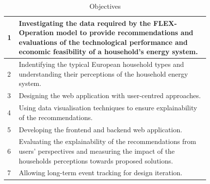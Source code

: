 \begin{table}[h]
    \begin{center}
        \begin{tabular}{ p{0.02\linewidth} p{0.8\linewidth} }
        \hline 
        \cellcolor{yellow!70!lime}1 & Investigating the data required by the FLEX-Operation model to provide recommendations and evaluations of the technological performance and economic feasibility of a household's energy system. \\
        \hline 
        \cellcolor{yellow!60!lime}2 & Indentifying the typical European household types and understanding their perceptions of the household energy system. \\
        \hline 
        \cellcolor{yellow!50!lime}3 & Designing the web application with user-centred approaches. \\
        \hline 
        \cellcolor{yellow!40!lime}4 & Using data visualisation techniques to ensure explainability of the recommendations. \\
        \hline 
        \cellcolor{yellow!30!lime}5 & Developing the frontend and backend web application. \\
        \hline 
        \cellcolor{yellow!20!lime}6 & Evaluating the explainability of the recommendations from users' perspectives and measuring the impact of the households perceptions towards proposed solutions. \\
        \hline
        \cellcolor{yellow!10!lime}7 & Allowing long-term event tracking for design iteration. \\
        \hline 
        \end{tabular}
        \caption{Objectives}
        \label{tab:objectives}
    \end{center}
\end{table}

